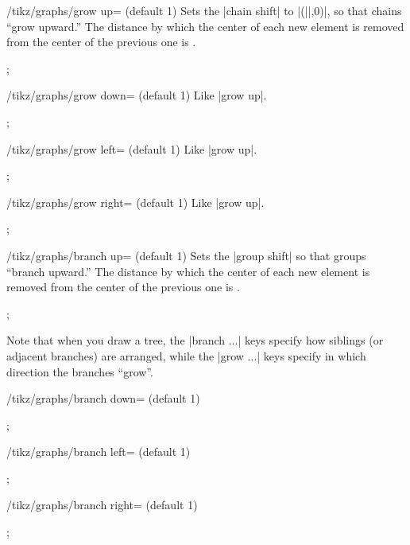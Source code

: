 \begin{key}{/tikz/graphs/grow up= (default 1)}
  Sets the |chain shift| to |(||,0)|, so that chains
  ``grow upward.'' The distance by which the center of each new
  element is removed from the center of the previous one is
  . 
\begin{codeexample}[]
\tikz {};      
\end{codeexample}
\end{key}
\begin{key}{/tikz/graphs/grow down= (default 1)}
  Like |grow up|.
\begin{codeexample}[]
\tikz {};      
\end{codeexample}
\end{key}
\begin{key}{/tikz/graphs/grow left= (default 1)}
  Like |grow up|.
\begin{codeexample}[]
\tikz {};      
\end{codeexample}
\end{key}
\begin{key}{/tikz/graphs/grow right= (default 1)}
  Like |grow up|.
\begin{codeexample}[]
\tikz {};      
\end{codeexample}
\end{key}
\begin{key}{/tikz/graphs/branch up= (default 1)}
  Sets the |group shift| so that groups ``branch upward.''  The
  distance by which the center of each new element is removed from
  the center of the previous one is .
\begin{codeexample}[]
\tikz {};      
\end{codeexample}
  Note that when you draw a tree, the |branch ...| keys specify how
  siblings (or adjacent branches) are arranged, while the |grow ...|
  keys specify in which direction the branches ``grow''.
\end{key}
\begin{key}{/tikz/graphs/branch down= (default 1)}
\begin{codeexample}[]
\tikz {};      
\end{codeexample}
\end{key}
\begin{key}{/tikz/graphs/branch left= (default 1)}
\begin{codeexample}[]
\tikz {};      
\end{codeexample}
\end{key}
\begin{key}{/tikz/graphs/branch right= (default 1)}
\begin{codeexample}[]
\tikz {};      
\end{codeexample}
\end{key}
  

